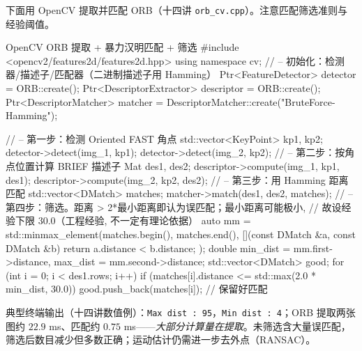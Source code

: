 \begin{practice}
下面用 OpenCV 提取并匹配 ORB（十四讲 \texttt{orb\_cv.cpp}\cite{gaoxiang2019slam14}）。注意匹配筛选准则与经验阈值。
\begin{codebox}[C++]{OpenCV ORB 提取 + 暴力汉明匹配 + 筛选}
#include <opencv2/features2d/features2d.hpp>
using namespace cv;
// -- 初始化：检测器/描述子/匹配器（二进制描述子用 Hamming）
Ptr<FeatureDetector>   detector  = ORB::create();
Ptr<DescriptorExtractor> descriptor = ORB::create();
Ptr<DescriptorMatcher> matcher = DescriptorMatcher::create("BruteForce-Hamming");

// -- 第一步：检测 Oriented FAST 角点
std::vector<KeyPoint> kp1, kp2;
detector->detect(img_1, kp1);
detector->detect(img_2, kp2);
// -- 第二步：按角点位置计算 BRIEF 描述子
Mat des1, des2;
descriptor->compute(img_1, kp1, des1);
descriptor->compute(img_2, kp2, des2);
// -- 第三步：用 Hamming 距离匹配
std::vector<DMatch> matches;
matcher->match(des1, des2, matches);
// -- 第四步：筛选。距离 > 2*最小距离即认为误匹配；最小距离可能极小,
//    故设经验下限 30.0（工程经验, 不一定有理论依据）
auto mm = std::minmax_element(matches.begin(), matches.end(),
    [](const DMatch &a, const DMatch &b){ return a.distance < b.distance; });
double min_dist = mm.first->distance, max_dist = mm.second->distance;
std::vector<DMatch> good;
for (int i = 0; i < des1.rows; i++)
    if (matches[i].distance <= std::max(2.0 * min_dist, 30.0))
        good.push_back(matches[i]);   // 保留好匹配
\end{codebox}
典型终端输出（十四讲数值例）：\texttt{Max dist : 95}，\texttt{Min dist : 4}；ORB 提取两张图约 $22.9$ ms、匹配约 $0.75$ ms——\emph{大部分计算量在提取}。未筛选含大量误匹配，筛选后数目减少但多数正确；运动估计仍需进一步去外点（RANSAC）。
\end{practice}

